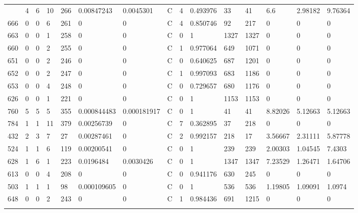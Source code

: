 \begin{latin}
\begin{longtable}{lllllllllllllll}
\begin{comment}
	671 & 4  & 6   & 10 & 266 & 0.00847243     & 0.0045301      & C & 4  & 0.493976 & 33   & 41   & 6.6     & 2.98182 & 9.76364 \\
	666 & 0  & 0   & 6  & 261 & 0              & 0              & C & 4  & 0.850746 & 92   & 217  & 0       & 0       & 0       \\
	663 & 0  & 0   & 1  & 258 & 0              & 0              & C & 0  & 1        & 1327 & 1327 & 0       & 0       & 0       \\
	660 & 0  & 0   & 2  & 255 & 0              & 0              & C & 1  & 0.977064 & 649  & 1071 & 0       & 0       & 0       \\
	651 & 0  & 0   & 2  & 246 & 0              & 0              & C & 0  & 0.640625 & 687  & 1201 & 0       & 0       & 0       \\
	652 & 0  & 0   & 2  & 247 & 0              & 0              & C & 1  & 0.997093 & 683  & 1186 & 0       & 0       & 0       \\
	653 & 0  & 0   & 4  & 248 & 0              & 0              & C & 0  & 0.729657 & 680  & 1176 & 0       & 0       & 0       \\
	626 & 0  & 0   & 1  & 221 & 0              & 0              & C & 0  & 1        & 1153 & 1153 & 0       & 0       & 0       \\
	760 & 5  & 5   & 5  & 355 & 0.000844483    & 0.000181917    & C & 0  & 1        & 41   & 41   & 8.82026 & 5.12663 & 5.12663 \\
	784 & 1  & 1   & 11 & 379 & 0.00256739     & 0              & C & 7  & 0.362895 & 37   & 218  & 0       & 0       & 0       \\
	432 & 2  & 3   & 7  & 27  & 0.00287461     & 0              & C & 2  & 0.992157 & 218  & 17   & 3.56667 & 2.31111 & 5.87778 \\
	524 & 1  & 1   & 6  & 119 & 0.00200541     & 0              & C & 0  & 1        & 239  & 239  & 2.00303 & 1.04545 & 7.4303  \\
	628 & 1  & 6   & 1  & 223 & 0.0196484      & 0.0030426      & C & 0  & 1        & 1347 & 1347 & 7.23529 & 1.26471 & 1.64706 \\
	613 & 0  & 0   & 4  & 208 & 0              & 0              & C & 0  & 0.941176 & 630  & 245  & 0       & 0       & 0       \\
	503 & 1  & 1   & 1  & 98  & 0.000109605    & 0              & C & 0  & 1        & 536  & 536  & 1.19805 & 1.09091 & 1.0974  \\
	648 & 0  & 0   & 2  & 243 & 0              & 0              & C & 1  & 0.984436 & 691  & 1215 & 0       & 0       & 0       \\

\end{comment}
\end{longtable}
\end{latin}
